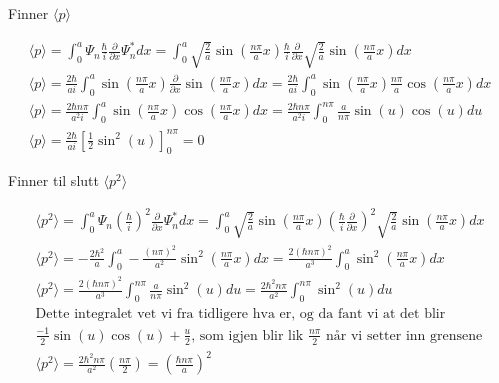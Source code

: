 \documentclass[11pt, A4paper,norsk]{article}
\begin{document}
			\begin{flushleft}
Finner $\langle p \rangle$
			\end{flushleft}
			\begin{gather*}
\langle p \rangle = \int_{0}^{a} \Psi_n \frac{\hbar}{i} \frac{\partial}{\partial x} \Psi_n^* dx = \int_{0}^{a} \sqrt{\frac{2}{a}} \sin\left( \frac{n \pi}{a} x \right) \frac{\hbar}{i} \frac{\partial}{\partial x} \sqrt{\frac{2}{a}} \sin\left( \frac{n \pi}{a} x \right) dx \\
\langle p \rangle = \frac{2 \hbar}{a i} \int_{0}^{a} \sin\left( \frac{n \pi}{a} x \right) \frac{\partial}{\partial x} \sin\left( \frac{n \pi}{a} x \right) dx = \frac{2 \hbar}{a i} \int_{0}^{a} \sin\left( \frac{n \pi}{a} x \right) \frac{n \pi}{a} \cos\left( \frac{n \pi}{a} x \right) dx \\
\langle p \rangle = \frac{2 \hbar n \pi}{a^2 i} \int_{0}^{a} \sin\left( \frac{n \pi}{a} x \right) \cos\left( \frac{n \pi}{a} x \right) dx = \frac{2 \hbar n \pi}{a^2 i} \int_{0}^{n \pi} \frac{a}{n \pi} \sin(u) \cos(u) du \\
\langle p \rangle = \frac{2 \hbar}{a i} \left[ \frac{1}{2} \sin^2(u) \right]_{0}^{n \pi} = 0
			\end{gather*}







			\begin{flushleft}
Finner til slutt $\langle p^2 \rangle$
			\end{flushleft}
			\begin{gather*}
\langle p^2 \rangle = \int_{0}^{a} \Psi_n \left( \frac{\hbar}{i} \right)^2 \frac{\partial}{\partial x} \Psi_n^* dx = \int_{0}^{a} \sqrt{\frac{2}{a}} \sin\left( \frac{n \pi}{a} x \right) \left( \frac{\hbar}{i} \frac{\partial}{\partial x} \right)^2 \sqrt{\frac{2}{a}} \sin\left( \frac{n \pi}{a} x \right) dx \\
\langle p^2 \rangle = - \frac{2 \hbar^2}{a} \int_{0}^{a} - \frac{(n \pi)^2}{a^2} \sin^2\left( \frac{n \pi}{a} x \right) dx = \frac{2 (\hbar n \pi)^2}{a^3} \int_{0}^{a} \sin^2\left( \frac{n \pi}{a} x \right) dx \\
\langle p^2 \rangle = \frac{2 (\hbar n \pi)^2}{a^3} \int_{0}^{n \pi} \frac{a}{n \pi} \sin^2\left( u \right) du = \frac{2 \hbar^2 n \pi}{a^2} \int_{0}^{n \pi} \sin^2\left( u \right) du \\
\text{Dette integralet vet vi fra tidligere hva er, og da fant vi at det blir} \\
\text{$\frac{-1}{2} \sin(u)\cos(u) + \frac{u}{2}$, som igjen blir lik $\frac{n \pi}{2}$ når vi setter inn grensene} \\
\langle p^2 \rangle = \frac{2 \hbar^2 n \pi}{a^2} \left(\frac{n \pi}{2} \right) = \left( \frac{\hbar n \pi}{a} \right)^2
			\end{gather*}
\end{document}
